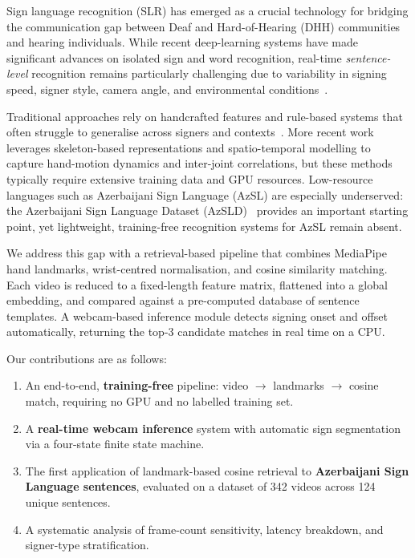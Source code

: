 \documentclass[runningheads]{llncs}
\begin{document}
Sign language recognition (SLR) has emerged as a crucial technology for
bridging the communication gap between Deaf and Hard-of-Hearing (DHH)
communities and hearing individuals.  
While recent deep-learning systems have made significant advances on
isolated sign and word recognition, real-time \emph{sentence-level}
recognition remains particularly challenging due to variability in
signing speed, signer style, camera angle, and environmental
conditions~\cite{liu2024skeleton}.

Traditional approaches rely on handcrafted features and rule-based
systems that often struggle to generalise across signers and
contexts~\cite{fang2013bayesian}.
More recent work leverages skeleton-based representations and
spatio-temporal modelling to capture hand-motion dynamics and
inter-joint correlations, but these methods typically require extensive
training data and GPU resources.
Low-resource languages such as Azerbaijani Sign Language (AzSL) are
especially underserved: the Azerbaijani Sign Language Dataset
(AzSLD)~\cite{alishzade2024azsld} provides an important starting
point, yet lightweight, training-free recognition systems for AzSL
remain absent.

We address this gap with a retrieval-based pipeline that combines
MediaPipe hand landmarks, wrist-centred normalisation, and cosine
similarity matching.  
Each video is reduced to a fixed-length feature matrix, flattened into a
global embedding, and compared against a pre-computed database of
sentence templates.  
A webcam-based inference module detects signing onset and offset
automatically, returning the top-3 candidate matches in real time on a
CPU.

Our contributions are as follows:
\begin{enumerate}
    \item An end-to-end, \textbf{training-free} pipeline: video
          $\rightarrow$ landmarks $\rightarrow$ cosine match, requiring
          no GPU and no labelled training set.
    \item A \textbf{real-time webcam inference} system with automatic
          sign segmentation via a four-state finite state machine.
    \item The first application of landmark-based cosine retrieval to
          \textbf{Azerbaijani Sign Language sentences}, evaluated on a
          dataset of 342 videos across 124 unique sentences.
    \item A systematic analysis of frame-count sensitivity, latency
          breakdown, and signer-type stratification.
\end{enumerate}
\end{document}
